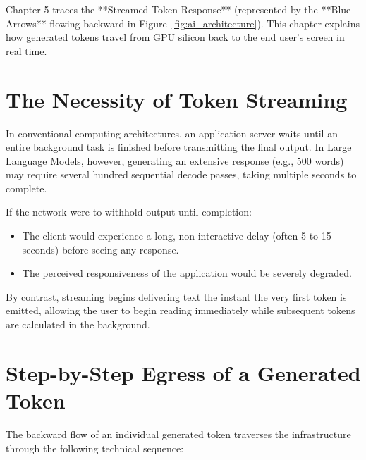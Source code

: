 \documentclass[12pt,a4paper]{report}
\begin{document}
Chapter 5 traces the **Streamed Token Response** (represented by the **Blue Arrows** flowing backward in Figure~\ref{fig:ai_architecture}). This chapter explains how generated tokens travel from GPU silicon back to the end user's screen in real time.

\section{The Necessity of Token Streaming}
In conventional computing architectures, an application server waits until an entire background task is finished before transmitting the final output. In Large Language Models, however, generating an extensive response (e.g., 500 words) may require several hundred sequential decode passes, taking multiple seconds to complete.

If the network were to withhold output until completion:
\begin{itemize}[leftmargin=1.2cm]
    \item The client would experience a long, non-interactive delay (often 5 to 15 seconds) before seeing any response.
    \item The perceived responsiveness of the application would be severely degraded.
\end{itemize}

By contrast, streaming begins delivering text the instant the very first token is emitted, allowing the user to begin reading immediately while subsequent tokens are calculated in the background.

\section{Step-by-Step Egress of a Generated Token}
The backward flow of an individual generated token traverses the infrastructure through the following technical sequence:
\end{document}
